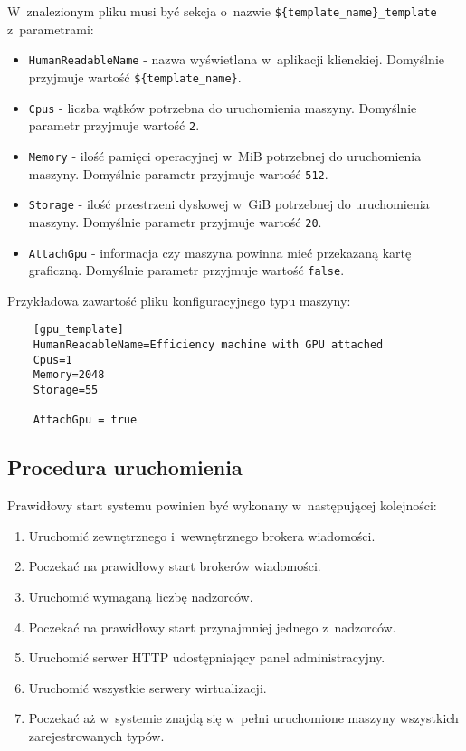 \documentclass[../opis-rozwiazania.tex]{subfiles}
\begin{document}
W~znalezionym pliku musi być sekcja o~nazwie \texttt{\$\{template\_name\}\_template} z~parametrami:
\begin{itemize}
  \item \texttt{HumanReadableName} - nazwa wyświetlana w~aplikacji klienckiej. Domyślnie przyjmuje wartość \texttt{\$\{template\_name\}}.
  \item \texttt{Cpus} - liczba wątków potrzebna do uruchomienia maszyny. Domyślnie parametr przyjmuje wartość \texttt{2}.
  \item \texttt{Memory} - ilość pamięci operacyjnej w~MiB potrzebnej do uruchomienia maszyny. Domyślnie parametr przyjmuje wartość \texttt{512}.
  \item \texttt{Storage} - ilość przestrzeni dyskowej w~GiB potrzebnej do uruchomienia maszyny. Domyślnie parametr przyjmuje wartość \texttt{20}.
  \item \texttt{AttachGpu} - informacja czy maszyna powinna mieć przekazaną kartę graficzną. Domyślnie parametr przyjmuje wartość \texttt{false}.
\end{itemize}

Przykładowa zawartość pliku konfiguracyjnego typu maszyny:

\begin{verbatim}
	[gpu_template]
	HumanReadableName=Efficiency machine with GPU attached
	Cpus=1
	Memory=2048
	Storage=55

	AttachGpu = true
\end{verbatim}

\subsection{Procedura uruchomienia}
\label{system_startup.procedure}
Prawidłowy start systemu powinien być wykonany w~następującej kolejności:
\begin{enumerate}
  \item Uruchomić zewnętrznego i~wewnętrznego brokera wiadomości.
  \item Poczekać na prawidłowy start brokerów wiadomości.
  \item Uruchomić wymaganą liczbę nadzorców.
  \item Poczekać na prawidłowy start przynajmniej jednego z~nadzorców.
  \item Uruchomić serwer HTTP udostępniający panel administracyjny.
  \item Uruchomić wszystkie serwery wirtualizacji.
  \item Poczekać aż w~systemie znajdą się w~pełni uruchomione maszyny wszystkich zarejestrowanych typów.
\end{enumerate}
\end{document}
